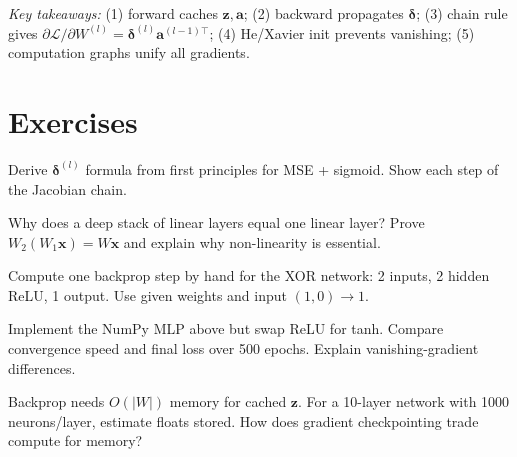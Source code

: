 \smallskip
\noindent\textit{Key takeaways:} (1) forward caches $\mathbf{z},\mathbf{a}$;
(2) backward propagates $\boldsymbol{\delta}$; (3) chain rule gives
$\partial\mathcal{L}/\partial W^{(l)}=\boldsymbol{\delta}^{(l)}\mathbf{a}^{(l-1)\top}$;
(4) He/Xavier init prevents vanishing; (5) computation graphs unify all gradients.

\section{Exercises}
\begin{exercise} Derive $\boldsymbol{\delta}^{(l)}$ formula from first principles for MSE + sigmoid. Show each step of the Jacobian chain.\end{exercise}
\begin{exercise} Why does a deep stack of linear layers equal one linear layer? Prove $W_2(W_1\mathbf{x})=W\mathbf{x}$ and explain why non-linearity is essential.\end{exercise}
\begin{exercise} Compute one backprop step by hand for the XOR network: 2 inputs, 2 hidden ReLU, 1 output. Use given weights and input $(1,0)\to1$.\end{exercise}
\begin{exercise} Implement the NumPy MLP above but swap ReLU for tanh. Compare convergence speed and final loss over 500 epochs. Explain vanishing-gradient differences.\end{exercise}
\begin{exercise} Backprop needs $O(|W|)$ memory for cached $\mathbf{z}$. For a 10-layer network with 1000 neurons/layer, estimate floats stored. How does gradient checkpointing trade compute for memory?\end{exercise}
